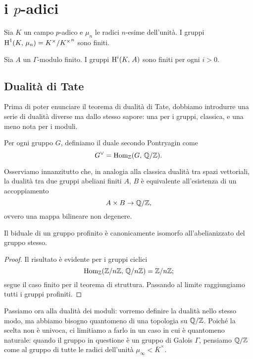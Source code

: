 \chapter{i $ p $-adici}

\begin{proposition}
	Sia $ K $ un campo $ p $-adico e $ \mu_n $ le radici $ n $-esime dell'unità. I gruppi $ \operatorname{H}^1(K, \, \mu_n) = K^\times / {K^\times}^n $ sono finiti.
\end{proposition}

\begin{corollary} \label{finiti}
	Sia $ A $ un $ \Gamma $-modulo finito. I gruppi $ \operatorname{H}^i(K, \, A) $ sono finiti per ogni $ i > 0 $.
\end{corollary}

\section{Dualità di Tate}
Prima di poter enunciare il teorema di dualità di Tate, dobbiamo introdurre una serie di dualità diverse ma dallo stesso sapore: una per i gruppi, classica, e una meno nota per i moduli.

\begin{definition}
	Per ogni gruppo $ G $, definiamo il duale secondo Pontryagin come
	\[ G^\vee = \operatorname{Hom}_{\mathbb{Z}}(G, \, \mathbb{Q}/\mathbb{Z}). \]
\end{definition}

Osserviamo innanzitutto che, in analogia alla classica dualità tra spazi vettoriali, la dualità tra due gruppi abeliani finiti $ A, \, B $ è equivalente all'esistenza di un accoppiamento
\[ A \times B \to \mathbb{Q}/\mathbb{Z}, \]
ovvero una mappa bilineare non degenere.

\begin{proposition}
	Il biduale di un gruppo profinito è canonicamente isomorfo all'abelianizzato del gruppo stesso. 
\end{proposition}
\begin{proof}
	Il risultato è evidente per i gruppi ciclici
	\[ \operatorname{Hom}_{\mathbb{Z}}(\mathbb{Z}/n\mathbb{Z}, \, \mathbb{Q}/n\mathbb{Z}) = \mathbb{Z}/n\mathbb{Z};  \]
	segue il caso finito per il teorema di struttura. Passando al limite raggiungiamo tutti i gruppi profiniti.
\end{proof}

Passiamo ora alla dualità dei moduli: vorremo definire la dualità nello stesso modo, ma abbiamo bisogno quantomeno di una topologia su $ \mathbb{Q}/\mathbb{Z} $. Poiché la scelta non è univoca, ci limitiamo a farlo in un caso in cui è quantomeno naturale: quando il gruppo in questione è un gruppo di Galois $ \Gamma $, pensiamo $ \mathbb{Q}/\mathbb{Z} $ come al gruppo di tutte le radici dell'unità $ \mu_\infty < \bar{K}^\times $.

